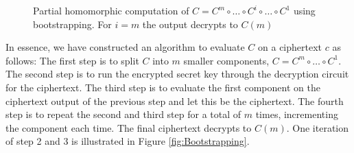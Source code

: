 \label{fig:Bootstrapping}
\begin{figure}
    \centering
    
    \caption{Partial homomorphic computation of $C = C^m \circ \dots \circ C^i \circ \dots \circ C^1$ using bootstrapping. For $i = m$ the output decrypts to $C(m)$}
\end{figure}

In essence, we have constructed an algorithm to evaluate $C$ on a ciphertext $c$ as follows: The first step is to split $C$ into $m$ smaller components, $C = C^m \circ \dots \circ C^1$. The second step is to run the encrypted secret key through the decryption circuit for the ciphertext. The third step is to evaluate the first component on the ciphertext output of the previous step and let this be the ciphertext. The fourth step is to repeat the second and third step for a total of $m$ times, incrementing the component each time. The final ciphertext decrypts to $C(m)$. One iteration of step 2 and 3 is illustrated in Figure \ref{fig:Bootstrapping}.

